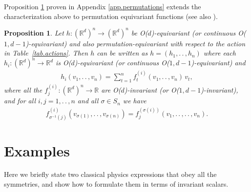 \documentclass{article}
\theoremstyle{Hogg}
\newtheorem{proposition}[theorem]{Proposition}
\renewcommand{\ldots}{.\,.\,}
\begin{document}
Proposition \ref{prop.permutation.equivariance} proven in Appendix \ref{app.permutations} extends the characterization above to permutation equivariant functions (see also \cite{gripaios2021lorentz, klicpera2021gemnet}). 
\begin{proposition} \label{prop.permutation.equivariance}
Let $h:(\mathbb R^d)^n\to (\mathbb R^{d})^n$ be O($d$)-equivariant (or continuous O($1,d-1$)-equivariant) and also permutation-equivariant with respect to the action in Table~\ref{tab.actions}. Then $h$ can be written as $h=(h_1, \ldots, h_n)$ where each $h_i:(\mathbb R^d)^n\to \mathbb R^{d}$ is O($d$)-equivariant (or continuous O($1,d-1$)-equivariant) and
\begin{align}
   h_i(v_1,\ldots, v_n)=  \textstyle\sum_{t=1}^n f_t^{(i)}(v_1,\ldots, v_n)\,v_t,
   \end{align}
   where
all the $f_j^{(i)}:(\mathbb R^d)^n\to \mathbb R$ are O($d$)-invariant (or  O($1,d-1$)-invariant), and for all $i,j=1,\ldots, n$  and all $\sigma\in S_n$ we have
\begin{align}
f^{(i)}_{\sigma^{-1}(j)}(v_{\sigma(1)}, \ldots, v_{\sigma(n)})= f^{(\sigma(i))}_j(v_1,\ldots, \ldots, v_n).
\end{align}
\end{proposition}

\section{Examples}\label{sec.examples}

Here we briefly state two classical physics expressions that obey all the symmetries, and show how to formulate them in terms of invariant scalars.
\end{document}
